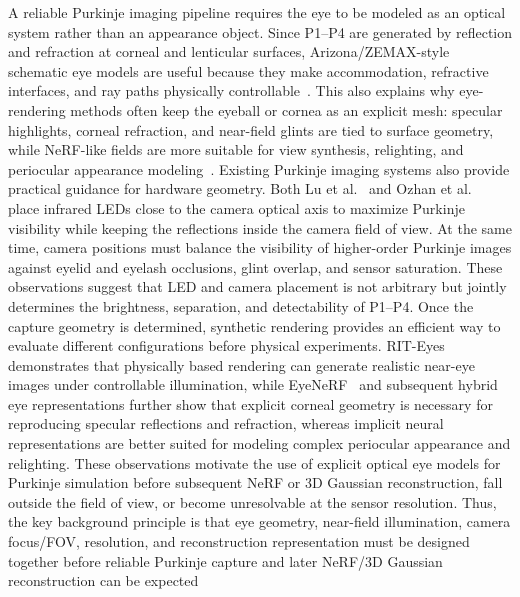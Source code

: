 \documentclass[sigconf,screen,review]{acmart}
\begin{document}
A reliable Purkinje imaging pipeline requires the eye to be modeled as an optical system rather than an appearance object. Since P1--P4 are generated by reflection and refraction at corneal and lenticular surfaces, Arizona/ZEMAX-style schematic eye models are useful because they make accommodation, refractive interfaces, and ray paths physically controllable~\cite{Improved_vergence_and_accommodation,Dynamic_accommodation_Purkinje}. This also explains why eye-rendering methods often keep the eyeball or cornea as an explicit mesh: specular highlights, corneal refraction, and near-field glints are tied to surface geometry, while NeRF-like fields are more suitable for view synthesis, relighting, and periocular appearance modeling~\cite{RIT-Eyes,EyeNeRF,Realistic_nerf_eyes}.
Existing Purkinje imaging systems also provide practical guidance for hardware geometry. Both Lu et al.~ and Ozhan et al.~ place infrared LEDs close to the camera optical axis to maximize Purkinje visibility while keeping the reflections inside the camera field of view. At the same time, camera positions must balance the visibility of higher-order Purkinje images against eyelid and eyelash occlusions, glint overlap, and sensor saturation. These observations suggest that LED and camera placement is not arbitrary but jointly determines the brightness, separation, and detectability of P1--P4.
Once the capture geometry is determined, synthetic rendering provides an efficient way to evaluate different configurations before physical experiments. RIT-Eyes~\cite{RIT-Eyes} demonstrates that physically based rendering can generate realistic near-eye images under controllable illumination, while EyeNeRF~\cite{EyeNeRF} and subsequent hybrid eye representations further show that explicit corneal geometry is necessary for reproducing specular reflections and refraction, whereas implicit neural representations are better suited for modeling complex periocular appearance and relighting. These observations motivate the use of explicit optical eye models for Purkinje simulation before subsequent NeRF or 3D Gaussian reconstruction, fall outside the field of view, or become unresolvable at the sensor resolution. Thus, the key background principle is that eye geometry, near-field illumination, camera focus/FOV, resolution, and reconstruction representation must be designed together before reliable Purkinje capture and later NeRF/3D Gaussian reconstruction can be expected~\cite{Gaussian_Splatting}
\end{document}
